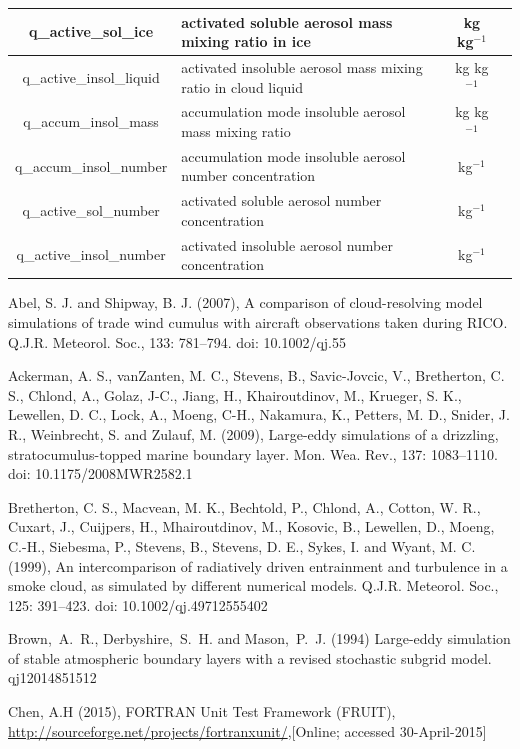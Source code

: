 \documentclass[a4paper,11pt]{article}
\begin{document}
\begin{table}[H]
\begin{tabular}{|c|p{7cm}|c|c|}
\hline
q\_active\_sol\_ice & activated soluble aerosol mass mixing ratio in ice & kg kg$^{-1}$ & \tabularnewline
\hline
q\_active\_insol\_liquid & activated insoluble aerosol mass mixing ratio in cloud liquid & kg kg$^{-1}$ & \tabularnewline
\hline
q\_accum\_insol\_mass & accumulation mode insoluble aerosol mass mixing ratio & kg kg$^{-1}$ & \tabularnewline
\hline
q\_accum\_insol\_number & accumulation mode insoluble aerosol number concentration & kg$^{-1}$ & \tabularnewline
\hline
q\_active\_sol\_number & activated soluble aerosol number concentration & kg$^{-1}$ & \tabularnewline
\hline
q\_active\_insol\_number & activated insoluble aerosol number concentration & kg$^{-1}$ & \tabularnewline
\hline
\hline
\end{tabular}
\end{table}


\begin{thebibliography}{}
\item{Abel, S. J. and Shipway, B. J. (2007), A comparison of cloud-resolving model simulations of trade wind cumulus with aircraft observations taken during RICO. Q.J.R. Meteorol. Soc., 133: 781–794. doi: 10.1002/qj.55}

\item{Ackerman, A. S., vanZanten, M. C., Stevens, B., Savic-Jovcic, V., Bretherton, C. S., Chlond, A., Golaz, J-C., Jiang, H., Khairoutdinov, M., Krueger, S. K., Lewellen, D. C., Lock, A., Moeng, C-H., Nakamura, K., Petters, M. D., Snider, J. R., Weinbrecht, S. and Zulauf, M. (2009), Large-eddy simulations of a drizzling, stratocumulus-topped marine boundary layer. Mon. Wea. Rev., 137: 1083–1110. doi: 10.1175/2008MWR2582.1}

\item{Bretherton, C. S., Macvean, M. K., Bechtold, P., Chlond, A., Cotton, W. R., Cuxart, J., Cuijpers, H., Mhairoutdinov, M., Kosovic,
    B., Lewellen, D., Moeng, C.-H., Siebesma, P., Stevens, B., Stevens, D. E., Sykes, I. and Wyant, M. C. (1999),
    An intercomparison of radiatively driven entrainment and turbulence in a smoke cloud, as simulated by different numerical
    models. Q.J.R. Meteorol. Soc., 125: 391–423. doi: 10.1002/qj.49712555402}

\item {Brown,~A.~R., Derbyshire,~S.~H. and Mason,~P.~J. (1994) Large-eddy simulation of stable atmospheric boundary layers with a revised stochastic
  subgrid model. qj{120}{1485}{1512}}

\item{Chen, A.H (2015), FORTRAN Unit Test Framework (FRUIT), \url{http://sourceforge.net/projects/fortranxunit/},[Online; accessed 30-April-2015]}


\end{thebibliography}
\end{document}
